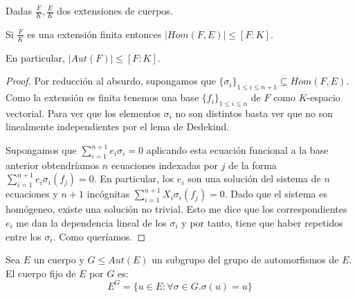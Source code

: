\begin{corollary}
Dadas $\frac{F}{K},\frac{E}{K}$ dos extensiones de cuerpos.

Si $\frac{F}{K}$ es una extensión finita entonces $|Hom(F,E)| \le [F:K]$. 

En particular, $|Aut(F)| \le [F:K]$.
\end{corollary} 
\begin{proof}
Por reducción al absurdo, supongamos que $\{\sigma_i\}_{1 \le i \le n+1} \subseteq Hom(F,E)$. Como la extensión es finita tenemos una base $\{f_i\}_{1 \le i \le n}$ de $F$ como $K$-espacio vectorial. Para ver que los elementos $\sigma_i$ no son distintos basta ver que no son linealmente independientes por el lema de Dedekind. 

Supongamos que $\sum_{i = 1}^{n+1} e_i\sigma_i = 0$ aplicando esta ecuación funcional a la base anterior obtendríamos $n$ ecuaciones indexadas por $j$ de la forma $\sum_{i = 1}^{n+1} e_i\sigma_i(f_j) = 0$. En particular, los $e_i$ son una solución del sistema de $n$ ecuaciones y $n+1$ incógnitas $\sum_{i = 1}^{n+1} X_i\sigma_i(f_j) = 0$. Dado que el sistema es homógeneo, existe una solución no trivial. Esto me dice que los correspondientes $e_i$ me dan la dependencia lineal de los $\sigma_i$ y por tanto, tiene que haber repetidos entre los $\sigma_i$. Como queríamos. 
\end{proof}

\begin{definition}
Sea $E$ un cuerpo y $G \le Aut(E)$ un subgrupo del grupo de automorfismos de $E$. El cuerpo fijo de $E$ por $G$ es: $$E^G = \{u \in E:\forall \sigma \in G.\sigma(u) = u \}$$
\end{definition}

